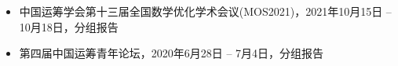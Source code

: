 %
%


{
\fontsize{9.5pt}{\baselineskip}\selectfont

\begin{itemize}[leftmargin=*]
	\item 中国运筹学会第十三届全国数学优化学术会议(MOS2021)，2021年10月15日 -- 10月18日，分组报告
	\item 第四届中国运筹青年论坛，2020年6月28日 -- 7月4日，分组报告 %
\end{itemize}
}